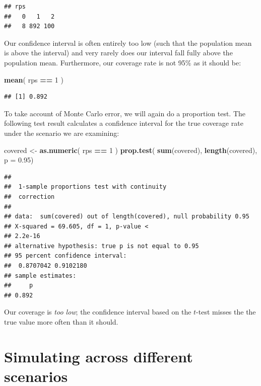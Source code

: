 \documentclass[
]{book}
\newenvironment{Shaded}{\begin{snugshade}}{\end{snugshade}}
\newcommand{\AttributeTok}[1]{\textcolor[rgb]{0.13,0.29,0.53}{#1}}
\newcommand{\DecValTok}[1]{\textcolor[rgb]{0.00,0.00,0.81}{#1}}
\newcommand{\FloatTok}[1]{\textcolor[rgb]{0.00,0.00,0.81}{#1}}
\newcommand{\FunctionTok}[1]{\textcolor[rgb]{0.13,0.29,0.53}{\textbf{#1}}}
\newcommand{\NormalTok}[1]{#1}
\newcommand{\OtherTok}[1]{\textcolor[rgb]{0.56,0.35,0.01}{#1}}
\newcommand{\SpecialCharTok}[1]{\textcolor[rgb]{0.81,0.36,0.00}{\textbf{#1}}}
\begin{document}
\begin{verbatim}
## rps
##   0   1   2 
##   8 892 100
\end{verbatim}

Our confidence interval is often entirely too low (such that the population mean is above the interval) and very rarely does our interval fall fully above the population mean.
Furthermore, our coverage rate is not 95\% as it should be:

\begin{Shaded}
\begin{Highlighting}[]
\FunctionTok{mean}\NormalTok{( rps }\SpecialCharTok{==} \DecValTok{1}\NormalTok{ )}
\end{Highlighting}
\end{Shaded}

\begin{verbatim}
## [1] 0.892
\end{verbatim}

To take account of Monte Carlo error, we will again do a proportion test.
The following test result calculates a confidence interval for the true coverage rate under the scenario we are examining:

\begin{Shaded}
\begin{Highlighting}[]
\NormalTok{covered }\OtherTok{\textless{}{-}} \FunctionTok{as.numeric}\NormalTok{( rps }\SpecialCharTok{==} \DecValTok{1}\NormalTok{ )}
\FunctionTok{prop.test}\NormalTok{( }\FunctionTok{sum}\NormalTok{(covered), }\FunctionTok{length}\NormalTok{(covered), }\AttributeTok{p =} \FloatTok{0.95}\NormalTok{)}
\end{Highlighting}
\end{Shaded}

\begin{verbatim}
## 
##  1-sample proportions test with continuity
##  correction
## 
## data:  sum(covered) out of length(covered), null probability 0.95
## X-squared = 69.605, df = 1, p-value <
## 2.2e-16
## alternative hypothesis: true p is not equal to 0.95
## 95 percent confidence interval:
##  0.8707042 0.9102180
## sample estimates:
##     p 
## 0.892
\end{verbatim}

Our coverage is \emph{too low}; the confidence interval based on the \(t\)-test misses the the true value more often than it should.

\section{Simulating across different scenarios}\label{simulating-across-different-scenarios}
\end{document}

